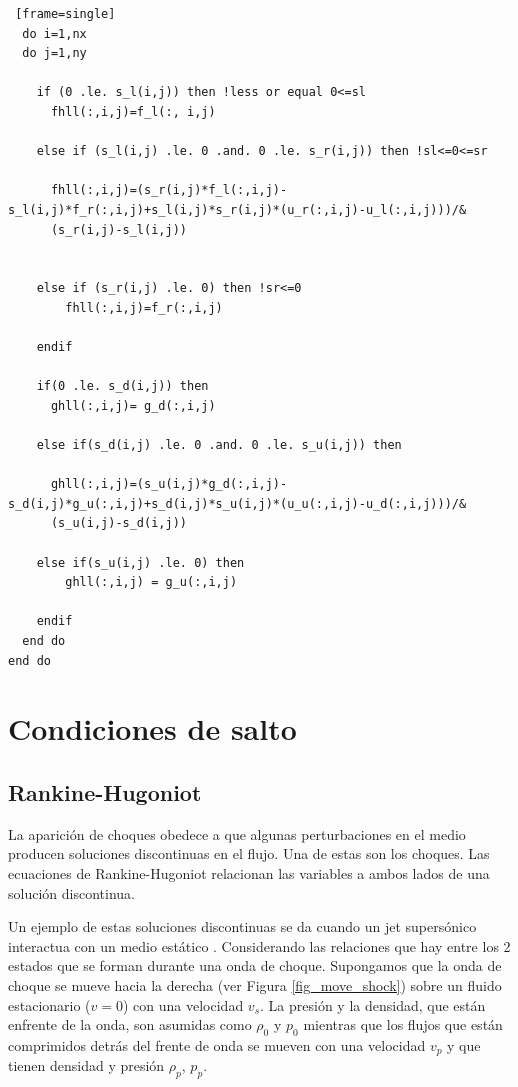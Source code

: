 \documentclass[12pt,a4paper]{book}
\begin{document}
\begin{lstlisting} [frame=single]
  do i=1,nx
  do j=1,ny
    
    if (0 .le. s_l(i,j)) then !less or equal 0<=sl
      fhll(:,i,j)=f_l(:, i,j)

    else if (s_l(i,j) .le. 0 .and. 0 .le. s_r(i,j)) then !sl<=0<=sr
  
      fhll(:,i,j)=(s_r(i,j)*f_l(:,i,j)-s_l(i,j)*f_r(:,i,j)+s_l(i,j)*s_r(i,j)*(u_r(:,i,j)-u_l(:,i,j)))/&
      (s_r(i,j)-s_l(i,j))


    else if (s_r(i,j) .le. 0) then !sr<=0
        fhll(:,i,j)=f_r(:,i,j)

    endif

    if(0 .le. s_d(i,j)) then
      ghll(:,i,j)= g_d(:,i,j)

    else if(s_d(i,j) .le. 0 .and. 0 .le. s_u(i,j)) then

      ghll(:,i,j)=(s_u(i,j)*g_d(:,i,j)-s_d(i,j)*g_u(:,i,j)+s_d(i,j)*s_u(i,j)*(u_u(:,i,j)-u_d(:,i,j)))/&
      (s_u(i,j)-s_d(i,j))

    else if(s_u(i,j) .le. 0) then
        ghll(:,i,j) = g_u(:,i,j)

    endif
  end do
end do
\end{lstlisting}



\section{Condiciones de salto}\label{sec:Condiciones_Salto}

\subsection{Rankine-Hugoniot}

La aparición de choques obedece a que algunas perturbaciones en el medio producen soluciones discontinuas en el flujo. Una de estas son los choques. Las ecuaciones de Rankine-Hugoniot
relacionan las variables a ambos lados de una solución discontinua.

Un ejemplo de estas soluciones discontinuas se da cuando un jet supersónico interactua con un medio estático \citep{Prunty2019}.
Considerando las relaciones que hay entre los 2 estados que se forman durante una onda de choque. Supongamos que la onda de choque se mueve 
hacia la derecha (ver Figura \ref{fig_move_shock}) sobre un fluido estacionario ($v = 0$) con una velocidad $v_s$. La presión y la densidad, que están enfrente de la onda, son asumidas como
$\rho_0$ y $p_0$ mientras que los flujos que están comprimidos detrás del frente de onda se mueven con una velocidad $v_p$ y que tienen densidad y presión $\rho_p$, $p_p$.
\end{document}
